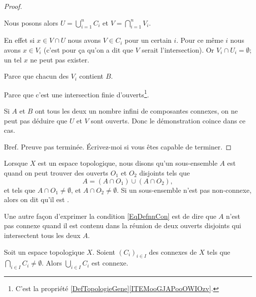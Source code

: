 \begin{proof}
\begin{subproof}
		Nous posons alors \( U=\bigcup_{i=1}^n C_i\) et \( V=\bigcap_{i=1}^nV_i\).
		\begin{subproof}
			\spitem[\( V\cap U=\emptyset\)]
			En effet si \( x\in V\cap U\) nous avons \( V\in C_i\) pour un certain \( i\). Pour ce même \( i\) nous avons \( x\in V_i\) (c'est pour ça qu'on a dit que \( V\) serait l'intersection). Or \( V_i\cap U_i=\emptyset\); un tel \( x\) ne peut pas exister.

			Parce que chacun des \( V_i\) contient \( B\).

			Parce que c'est une intersection finie d'ouverts\footnote{C'est la propriété \ref{DefTopologieGene}\ref{ITEMooGJAPooOWIOzv}.}.
		\end{subproof}
		\spitem[Le problème]
		Si \( A\) et \( B\) ont tous les deux un nombre infini de composantes connexes, on ne peut pas déduire que \( U\) et \( V\) sont ouverts. Donc le démonstration coince dans ce cas.
	\end{subproof}

	Bref. Preuve pas terminée. Écrivez-moi si vous êtes capable de terminer.

\end{proof}

\begin{definition}  \label{DefIRKNooJJlmiD}
	Lorsque \( X\) est un espace topologique, nous disons qu'un sous-ensemble \( A\) est  quand on peut trouver des ouverts \( O_1\) et \( O_2\) disjoints tels que
	\begin{equation}    \label{EqDefnnCon}
		A=(A\cap O_1)\cup (A\cap O_2),
	\end{equation}
	et tels que \( A\cap O_1\neq\emptyset\), et \( A\cap O_2\neq\emptyset\). Si un sous-ensemble n'est pas non-connexe, alors on dit qu'il est .
\end{definition}
Une autre façon d'exprimer la condition \eqref{EqDefnnCon} est de dire que \( A\) n'est pas connexe quand il est contenu dans la réunion de deux ouverts disjoints qui intersectent tous les deux \( A\).


\begin{proposition}		\label{PROPooBCFXooRlMvch}
	Soit un espace topologique \( X\). Soient \( (C_i)_{i\in I}\) des connexes de \( X\) tels que \( \bigcap_{i\in I}C_i\neq \emptyset\). Alors \( \bigcup_{i\in I}C_i\) est connexe.
\end{proposition}

